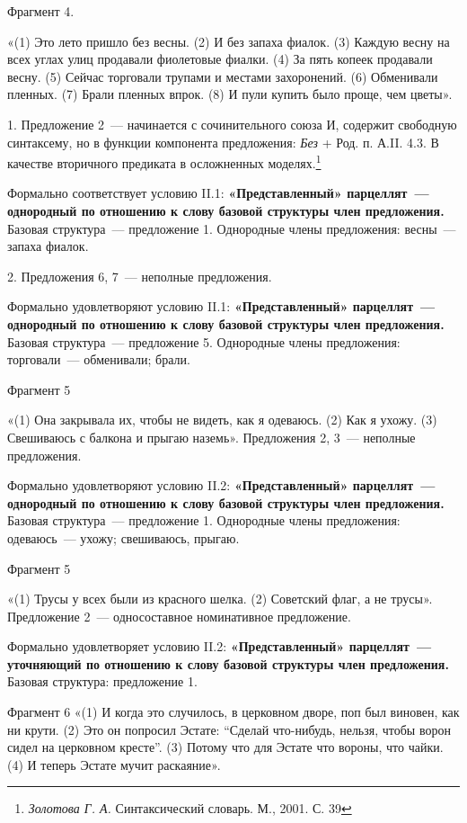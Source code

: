 \documentclass{kursa4}
\begin{document}
      Фрагмент 4.

      «(1) Это лето пришло без весны. (2) И без запаха фиалок. (3) Каждую весну на всех углах улиц продавали фиолетовые фиалки. (4) За пять копеек продавали весну. (5) Сейчас торговали трупами и местами захоронений. (6) Обменивали пленных. (7) Брали пленных впрок. (8) И пули купить было проще, чем цветы».

      1. Предложение 2~--- начинается с сочинительного союза И, содержит свободную синтаксему, но в функции компонента предложения: \textit{Без }+ Род. п. А.II. 4.3. В качестве вторичного предиката в осложненных моделях.\footnote{\textit{Золотова Г. А.} Синтаксический словарь. М., 2001. С. 39}

      Формально соответствует условию II.1: \textbf{«Представленный» парцеллят~--- однородный по отношению к слову базовой структуры член предложения.} Базовая структура~--- предложение 1. Однородные члены предложения: весны~--- запаха фиалок.

      {2. Предложения 6, 7~--- неполные предложения.}

      {Формально
      }{удовлетворяют}{
      }{условию II.1}{:
      }\textbf{{«Представленный» парцеллят~--- однородный по отношению к слову базовой структуры член предложения.
      }}{Базовая структура~--- предложение 5. Однородные члены предложения: торговали~--- обменивали; брали.}

      {Фрагмент 5}

      «(1) Она закрывала их, чтобы не видеть, как я одеваюсь. (2) Как я ухожу. (3) Свешиваюсь с балкона и прыгаю наземь». Предложения 2, 3~--- неполные предложения. 

      {Формально
      }{удовлетворяют}{
      }{условию }{II.2}{:
      }\textbf{{«Представленный» парцеллят~--- однородный по отношению к слову базовой структуры член предложения.
      }}{Базовая структура~--- предложение
      }{1}{. Однородные члены предложения: }{одеваюсь~--- ухожу; свешиваюсь, прыгаю.}

      {Фрагмент 5}

     «(1) Трусы у всех были из красного шелка. (2) Советский флаг, а не трусы». Предложение 2~--- односоставное номинативное предложение. 

     Формально удовлетворяет условию II.2: \textbf{«Представленный» парцеллят~--- уточняющий по отношению к слову базовой структуры член предложения. }Базовая структура: предложение 1. 

     Фрагмент 6 «(1) И когда это случилось, в церковном дворе, поп был виновен, как ни крути. (2) Это он попросил Эстате: “Сделай что-нибудь, нельзя, чтобы ворон сидел на церковном кресте”. (3) Потому что для Эстате что вороны, что чайки. (4) И теперь Эстате мучит раскаяние». 
\end{document}
